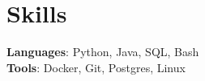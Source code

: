 \section{Skills}
 \begin{itemize}[leftmargin=0.15in, label={}]
    \small{\item{
     \textbf{Languages}{: Python, Java, SQL, Bash} \\
     \textbf{Tools}{: Docker, Git, Postgres, Linux}
    }}
 \end{itemize}
